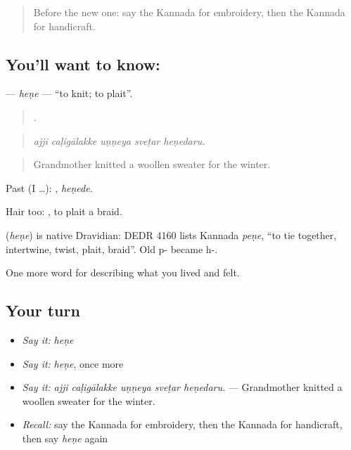\label{lesson:KA-C533-hene}



\begin{quote}
Before the new one: say the Kannada for embroidery, then the Kannada for handicraft.
\end{quote}

\subsection*{You'll want to know: }
\textbf{} — \emph{heṇe} — \textquotedblleft{}to knit; to plait\textquotedblright{}.

\begin{quote}
    .
\end{quote}

\begin{quote}
\emph{ajji caḷigālakke uṇṇeya sveṭar heṇedaru.}
\end{quote}

\begin{quote}
Grandmother knitted a woollen sweater for the winter.
\end{quote}

Past (I …): , \emph{heṇede}.

Hair too:  , to plait a braid.

\begin{cousinweb}
\textbf{} (\emph{heṇe}) is native Dravidian: DEDR 4160 lists Kannada \emph{peṇe}, \textquotedblleft{}to tie together, intertwine, twist, plait, braid\textquotedblright{}. Old p- became h-.
\end{cousinweb}

\begin{grammarlens}[title={What you've built}]
One more word for describing what you lived and felt.
\end{grammarlens}

\subsection*{Your turn}
\begin{itemize}
\raggedright
  \item \emph{Say it:} \emph{heṇe}
  \item \emph{Say it:} \emph{heṇe}, once more
  \item \emph{Say it:} \emph{ajji caḷigālakke uṇṇeya sveṭar heṇedaru.} — Grandmother knitted a woollen sweater for the winter.
  \item \emph{Recall:} say the Kannada for embroidery, then the Kannada for handicraft, then say \emph{heṇe} again
\end{itemize}

